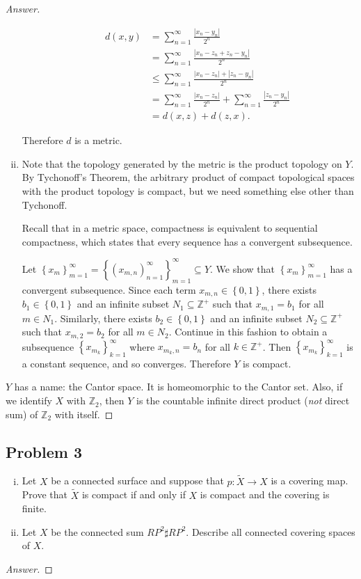 \documentclass[12pt]{article}
\newcommand{\z}{\mathbb{Z}}
\newcommand{\ita}[1]{\textit{#1}}
\newcommand\paren[1]{\left( #1 \right)}
\newcommand\setb[1]{\left \{ #1 \right \}}
\newcommand{\abs}[1]{\left| #1 \right|}
\theoremstyle{definition}
\begin{document}
\begin{proof}[Answer]
\begin{enumerate}[(i)]
\begin{itemize}
\begin{align*}
                d(x,y) & = \sum\limits_{n = 1}^{\infty} \frac{\abs{ x_n - y_n }}{2^n} \\
                & = \sum\limits_{n = 1}^{\infty} \frac{\abs{ x_n - z_n + z_n - y_n }}{2^n} \\
                & \leq \sum\limits_{n = 1}^{\infty} \frac{\abs{ x_n - z_n }  + \abs{ z_n - y_n }}{2^n} \\
                & = \sum\limits_{n = 1}^{\infty} \frac{\abs{ x_n - z_n }}{2^n} + \sum\limits_{n = 1}^{\infty} \frac{\abs{ z_n - y_n }}{2^n} \\
                & = d(x,z) + d(z,x).
            \end{align*}
        \end{itemize}
        Therefore $d$ is a metric.
        \item Note that the topology generated by the metric is the product topology on $Y$. By Tychonoff's Theorem, the arbitrary product of compact topological spaces with the product topology is compact, but we need something else other than Tychonoff.
        
        Recall that in a metric space, compactness is equivalent to sequential compactness, which states that every sequence has a convergent subsequence. 
        
        Let $\setb{ x_m }_{m = 1}^{\infty} = \setb{ \paren{ x_{m,n} }_{n = 1}^{\infty} }_{m = 1}^{\infty} \subseteq Y$. We show that $\setb{ x_m }_{m = 1}^{\infty}$ has a convergent subsequence. Since each term $x_{m,n} \in \setb{0,1}$, there exists $b_1 \in \setb{ 0 , 1 }$ and an infinite subset $N_1 \subseteq \z^+$ such that $x_{m,1} = b_1$ for all $m \in N_1$. Similarly, there exists $b_2 \in \setb{ 0 , 1 }$ and an infinite subset $N_2 \subseteq \z^+$ such that $x_{m,2} = b_2$ for all $m \in N_2$. Continue in this fashion to obtain a subsequence $\setb{ x_{m_k} }_{k = 1}^{\infty}$ where $x_{m_k,n} = b_n$ for all $k \in \z^+$. Then $\setb{ x_{m_k} }_{k = 1}^{\infty}$ is a constant sequence, and so converges. Therefore $Y$ is compact.
    \end{enumerate}
    $Y$ has a name: the Cantor space. It is homeomorphic to the Cantor set. Also, if we identify $X$ with $\z_2$, then $Y$ is the countable infinite direct product (\ita{not} direct sum) of $\z_2$ with itself.
\end{proof}
\subsection{Problem 3}
\begin{enumerate}[(i)]
    \item Let $X$ be a connected surface and suppose that $p : \tilde{X} \to X$ is a covering map. Prove that $\tilde{X}$ is compact if and only if $X$ is compact and the covering is finite.
    \item Let $X$ be the connected sum $RP^2 \sharp RP^2$. Describe all connected covering spaces of $X$.
\end{enumerate}
\begin{proof}[Answer]
    
\end{proof}
\end{document}
